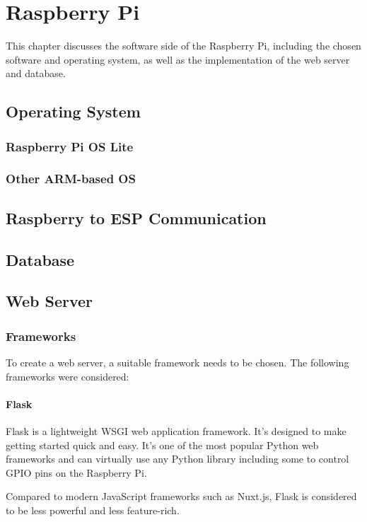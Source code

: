 \chapter{Raspberry Pi}
This chapter discusses the software side of the Raspberry Pi,
including the chosen software and operating system, as well 
as the implementation of the web server and database.
    \section{Operating System}
        \subsection{Raspberry Pi OS Lite}
        \subsection{Other ARM-based OS}
    \section{Raspberry to ESP Communication}
    \section{Database}
    \section{Web Server}
        \subsection{Frameworks}
        To create a web server, a suitable framework needs
        to be chosen. The following frameworks were considered:

            \subsubsection{Flask}
            Flask is a lightweight WSGI web application framework.
            It's designed to make getting started quick and easy. 
            It's one of the most popular Python web frameworks and
            can virtually use any Python library including some
            to control GPIO pins on the Raspberry Pi.

            Compared to modern JavaScript frameworks such as Nuxt.js, 
            Flask is considered to be less powerful and less 
            feature-rich.

